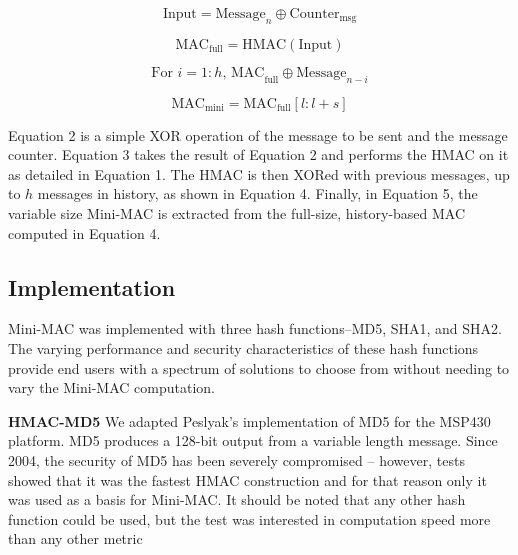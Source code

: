 \begin{equation}
\text{Input} = \text{Message}_n\oplus\text{Counter}_{\text{msg}}
\end{equation}

\begin{equation}
\text{MAC}_{\text{full}} = \text{HMAC}(\text{Input})
\end{equation}

\begin{equation}
\text{For }i=1:h \text{, MAC}_{\text{full}}\oplus\text{Message}_{n-i}
\end{equation}

\begin{equation}
\text{MAC}_{\text{mini}} = \text{MAC}_{\text{full}}[l:l+s]
\end{equation}

Equation 2 is a simple XOR operation of the message to be sent and the message counter. Equation 3 takes the result of Equation 2 and performs the HMAC on it as detailed in Equation 1. The HMAC is then XORed with previous messages, up to $h$ messages in history, as shown in Equation 4. Finally, in Equation 5, the variable size Mini-MAC is extracted from the full-size, history-based MAC computed in Equation 4.

\subsection{Implementation}
Mini-MAC was implemented with three hash functions--MD5, SHA1, and SHA2. The varying performance and security characteristics of these hash functions provide end users with a spectrum of solutions to choose from without needing to vary the Mini-MAC computation.

\textbf{HMAC-MD5}
We adapted Peslyak's implementation of MD5 for the MSP430 platform. MD5 produces a 128-bit output from a variable length message. Since 2004, the security of MD5 has been severely compromised \cite{Wang-MD5} -- however, tests showed that it was the fastest HMAC construction and for that reason only it was used as a basis for Mini-MAC. It should be noted that any other hash function could be used, but the test was interested in computation speed more than any other metric\cite{MD5}

